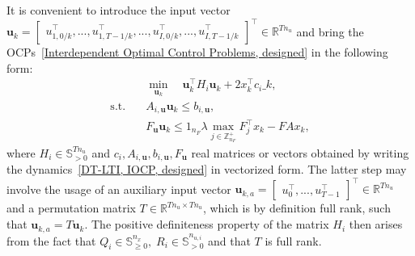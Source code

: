 \documentclass[letterpaper, 10 pt, conference]{ieeeconf}  %
\newcommand{\R}{\mathbb{R}}
\newcommand{\Z}{\mathbb{Z}}
\newcommand{\bbS}{\mathbb{S}}
\newcommand{\bu}{\mathbf{u}}
\begin{document}
It is convenient to introduce the input vector $\bu_{k} = \begin{bmatrix} u^{\top}_{1,0/k},...,u^{\top}_{1,T-1/k},...,u^{\top}_{I,0/k},...,u^{\top}_{I,T-1/k}\end{bmatrix}^{\top} \in \R^{Tn_{u}}$ and bring the OCPs~\eqref{Interdependent Optimal Control Problems, designed} in the following form:
\begin{subequations}\label{Generalized Nash Equilibrium Problem}
\begin{align}
& \min_{\mathbf{u}_{k}} \quad \bu^{\top}_{k} H_{i} \bu_{k} + 2x^{\top}_{k} c_{i} \_{k},\\
\text{s.t.} \quad & A_{i,\bu} \bu_{k} \leq b_{i,\bu},\label{Shared Constraint, all prediction time steps, designed, GNEP}\\
& F_{\bu}\bu_{k} \leq 1_{n_{F}} \lambda \max_{j \in \Z^{+}_{n_{F}}} F^{\top}_{j}x_{k} - F A x_{k}, \label{Shared constraint, initial prediction step, designed, GNEP}
\end{align}
\end{subequations}
where $H_{i} \in \bbS^{Tn_{u}}_{>0}$ and $c_{i}, A_{i,\bu}, b_{i,\bu}, F_{\bu}$ real matrices or vectors obtained by writing the dynamics~\eqref{DT-LTI, IOCP, designed} in vectorized form. The latter step may involve the usage of an auxiliary input vector $\bu_{k,a} = \begin{bmatrix} u^{\top}_{0},...,u^{\top}_{T-1}\end{bmatrix}^{\top} \in \R^{Tn_{u}}$ and a permutation matrix $T \in \R^{Tn_{u} \times Tn_{u}}$, which is by definition full rank, such that $\bu_{k,a} = T \bu_{k}$. The positive definiteness property of the matrix $H_{i}$ then arises from the fact that $Q_{i} \in \bbS^{n_x}_{\geq 0},\; R_{i} \in \bbS^{n_{u,i}}_{> 0}$ and that $T$ is full rank. 
\end{document}
